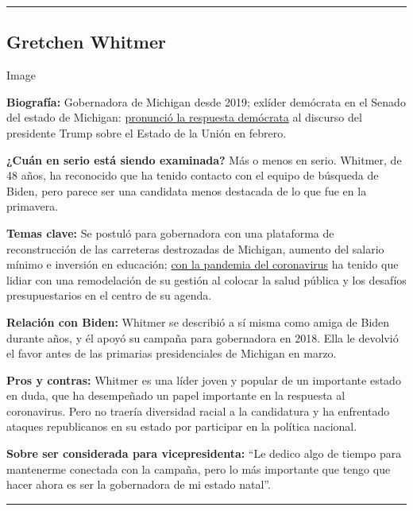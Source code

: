 \begin{center}\rule{0.5\linewidth}{\linethickness}\end{center}

\hypertarget{gretchen-whitmer}{%
\subsection{Gretchen Whitmer}\label{gretchen-whitmer}}

Image

\textbf{Biografía:} Gobernadora de Michigan desde 2019; exlíder
demócrata en el Senado del estado de Michigan:
\href{https://www.nytimes3xbfgragh.onion/2020/02/04/us/politics/gretchen-whitmer-state-of-the-union.html}{pronunció
la respuesta demócrata} al discurso del presidente Trump sobre el Estado
de la Unión en febrero.

\textbf{¿Cuán en serio está siendo examinada?} Más o menos en serio.
Whitmer, de 48 años, ha reconocido que ha tenido contacto con el equipo
de búsqueda de Biden, pero parece ser una candidata menos destacada de
lo que fue en la primavera.

\textbf{Temas clave:} Se postuló para gobernadora con una plataforma de
reconstrucción de las carreteras destrozadas de Michigan, aumento del
salario mínimo e inversión en educación;
\href{https://www.nytimes3xbfgragh.onion/2020/04/18/us/politics/gretchen-whitmer-michigan-protests.html}{con
la pandemia del coronavirus} ha tenido que lidiar con una remodelación
de su gestión al colocar la salud pública y los desafíos presupuestarios
en el centro de su agenda.

\textbf{Relación con Biden:} Whitmer se describió a sí misma como amiga
de Biden durante años, y él apoyó su campaña para gobernadora en 2018.
Ella le devolvió el favor antes de las primarias presidenciales de
Michigan en marzo.

\textbf{Pros y contras:} Whitmer es una líder joven y popular de un
importante estado en duda, que ha desempeñado un papel importante en la
respuesta al coronavirus. Pero no traería diversidad racial a la
candidatura y ha enfrentado ataques republicanos en su estado por
participar en la política nacional.

\textbf{Sobre ser considerada para vicepresidenta:} ``Le dedico algo de
tiempo para mantenerme conectada con la campaña, pero lo más importante
que tengo que hacer ahora es ser la gobernadora de mi estado natal''.

\begin{center}\rule{0.5\linewidth}{\linethickness}\end{center}

